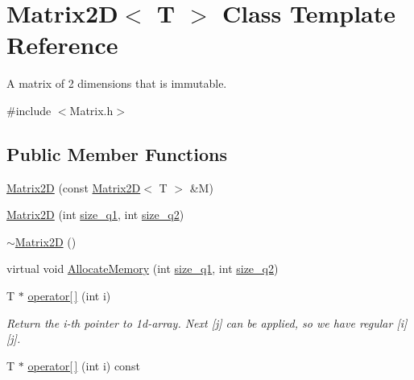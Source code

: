 \hypertarget{class_matrix2_d}{}\section{Matrix2\+D$<$ T $>$ Class Template Reference}
\label{class_matrix2_d}


A matrix of 2 dimensions that is immutable.  




{\ttfamily \#include $<$Matrix.\+h$>$}

\subsection*{Public Member Functions}
\begin{DoxyCompactItemize}
\item 
\hyperlink{class_matrix2_d_a70cfce61342db6f6778b5464a4079f7e}{Matrix2\+D} (const \hyperlink{class_matrix2_d}{Matrix2\+D}$<$ T $>$ \&M)
\item 
\hyperlink{class_matrix2_d_ae09bd41b87257bfa3ca402bb97c6012e}{Matrix2\+D} (int \hyperlink{class_matrix2_d_aa0f54dbae7f59acd18606277b03f505e}{size\+\_\+q1}, int \hyperlink{class_matrix2_d_af6b3e94e8b47cbfcd7cb90ca25cca1ac}{size\+\_\+q2})
\item 
\hyperlink{class_matrix2_d_a6b86d001220161af2136ba49fd8b26b9}{$\sim$\+Matrix2\+D} ()
\item 
virtual void \hyperlink{class_matrix2_d_a4c885c76d9d720755bf5b93b5306ea7e}{Allocate\+Memory} (int \hyperlink{class_matrix2_d_aa0f54dbae7f59acd18606277b03f505e}{size\+\_\+q1}, int \hyperlink{class_matrix2_d_af6b3e94e8b47cbfcd7cb90ca25cca1ac}{size\+\_\+q2})
\item 
\hypertarget{class_matrix2_d_a93cbc8910a8b6aa7ab9fb9dbb5cb8c73}{}T $\ast$ \hyperlink{class_matrix2_d_a93cbc8910a8b6aa7ab9fb9dbb5cb8c73}{operator\mbox{[}$\,$\mbox{]}} (int i)\label{class_matrix2_d_a93cbc8910a8b6aa7ab9fb9dbb5cb8c73}

\begin{DoxyCompactList}\small\item\em Return the i-\/th pointer to 1d-\/array. Next \mbox{[}j\mbox{]} can be applied, so we have regular \mbox{[}i\mbox{]}\mbox{[}j\mbox{]}. \end{DoxyCompactList}\item 
\hypertarget{class_matrix2_d_a19f8ab2d2bf0275873bec66aeaff9c8c}{}T $\ast$ \hyperlink{class_matrix2_d_a19f8ab2d2bf0275873bec66aeaff9c8c}{operator\mbox{[}$\,$\mbox{]}} (int i) const \label{class_matrix2_d_a19f8ab2d2bf0275873bec66aeaff9c8c}


\end{DoxyCompactItemize}
